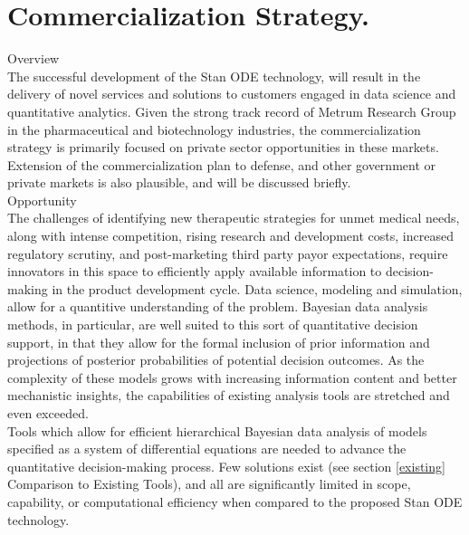 \section{Commercialization Strategy.}


\noindent
{\sc Overview}
\\[2pt]
The successful development of the Stan ODE technology, will result in
the delivery of novel services and solutions to customers engaged in
data science and quantitative analytics. Given the strong track record
of Metrum Research Group in the pharmaceutical and biotechnology
industries, the commercialization strategy is primarily focused on
private sector opportunities in these markets. Extension of the
commercialization plan to defense, and other government or private
markets is also plausible, and will be discussed briefly.
\\

\noindent
{\sc Opportunity}
\\[2pt]
The challenges of identifying new therapeutic strategies for unmet
medical needs, along with intense competition, rising research and
development costs, increased regulatory scrutiny, and post-marketing
third party payor expectations, require innovators in this space to
efficiently apply available information to decision-making in the
product development cycle. Data science, modeling and simulation,
allow for a quantitive understanding of the problem. Bayesian data
analysis methods, in particular, are well suited to this sort of
quantitative decision support, in that they allow for the formal
inclusion of prior information and projections of posterior
probabilities of potential decision outcomes. As the complexity of
these models grows with increasing information content and better
mechanistic insights, the capabilities of existing analysis tools are
stretched and even exceeded.\\ 

\noindent
Tools which allow for efficient hierarchical Bayesian data analysis of
models specified as a system of differential equations are  needed to
advance the quantitative decision-making process. Few solutions exist
(see section \ref{existing} Comparison to Existing Tools), and all are
significantly limited in scope, capability, or computational
efficiency when compared to the proposed Stan ODE technology.\\ 
 
